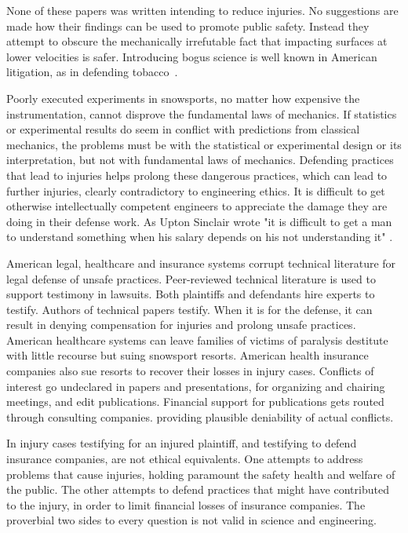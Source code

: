 \documentclass[smallextended]{svjour3}       %
\begin{document}
None of these
papers was written intending to reduce injuries. No suggestions are made
how their findings can be used to promote public safety. Instead they attempt to obscure
the mechanically irrefutable fact that impacting  surfaces at lower velocities is
safer. Introducing bogus science is well known in American litigation, as in
defending tobacco~\cite{Oreskes2010}.

Poorly executed experiments in snowsports, no matter how expensive the
instrumentation, cannot disprove the fundamental laws of mechanics. If statistics
or experimental results do seem in conflict with predictions from classical
mechanics, the problems must be with the statistical or experimental design or its
interpretation, but not with fundamental laws of mechanics. Defending practices
that lead to injuries helps prolong these dangerous practices, which can lead to
further injuries, clearly contradictory to engineering ethics. It is difficult
to get otherwise intellectually competent engineers to appreciate the damage
they are doing in their defense work.  As Upton Sinclair wrote "it is difficult
to get a man to understand something when his salary depends on his not
understanding it" \cite{Sinclair1994}.


American legal, healthcare and insurance systems corrupt technical literature
for legal defense of unsafe practices. Peer-reviewed technical literature is
used to support testimony in lawsuits. Both plaintiffs and defendants hire
experts to testify. Authors of technical papers testify. When it is for the
defense, it can result in denying compensation for injuries and prolong unsafe
practices. American healthcare systems can leave families of victims of
paralysis destitute with little recourse but suing snowsport resorts.  American
health insurance companies also sue resorts to recover their losses in injury
cases. Conflicts of interest go undeclared in papers and presentations, for
organizing and chairing meetings, and edit publications. Financial support for
publications gets routed through consulting companies. providing plausible
deniability of actual conflicts.

In injury cases testifying for an injured plaintiff, and testifying to defend
insurance companies, are not ethical equivalents. One attempts to address
problems that cause injuries, holding paramount the safety health and welfare
of the public. The other attempts to defend practices that might have
contributed to the injury, in order to limit financial losses of insurance
companies. The proverbial two sides to every question is not valid in science
and engineering.
\end{document}
